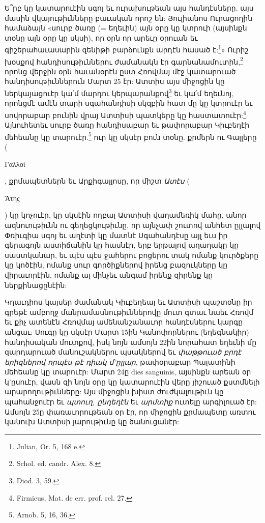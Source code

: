\documentclass{article}
\begin{document}
{Ե՞րբ կը կատարուէին սգոյ եւ ուրախութեան այս հանդէսները. այս մասին վկայութիւնները բաւական որոշ են: Յուլիանոս Ուրացողին համաձայն «սուրբ ծառը (= եղեւին) այն օրը կը կտրուի (այսինքն տօնը այն օրը կը սկսի), որ օրն որ արեւը օրուան եւ գիշերահաւասարին զենիթի բարձունքն արդէն հասած է:\footnote{Julian, Or. 5, 168 e.}» Ուրիշ խօսքով հանդիսութիւններու ժամանակն էր գարնանամուտին,\footnote{Schol. ed. candr. Alex. 8.} որոնց վերջին օրն հաւանօրէն ըստ Հռովմայ մէջ կատարուած հանդիսութիւններուն Մարտ 25 էր: Ատտիս այս միջոցին կը ներկայացուէր կա՛մ մարդու կերպարանքով\footnote{Diod. 3, 59.} եւ կա՛մ եղեւնոյ, որոնցմէ ամէն տարի սգահանդիսի սկզբին հատ մը կը կտրուէր եւ սովորաբար բունին վրայ Ատտիսի պատկերը կը հաստատուէր:\footnote{Firmicus, Mat. de err. prof. rel. 27.} Այնուհետեւ սուրբ ծառը հանդիսաբար եւ թափորաբար Կիւբեղէի մեհեանը կը տարուէր.\footnote{Arnob. 5, 16, 36.} ուր կը սկսէր բուն տօնը. քրմերն ու Գալլերը (\begin{greek}Γαλλοί\end{greek}, քրմապետներն եւ Արքիգալլոսը, որ միշտ \emph{Ատէս} (\begin{greek}Ἄτης\end{greek}) կը կոչուէր, կը սկսէին ողբալ Ատտիսի վաղամեռիկ մահը, անոր ազնուութիւնն ու գեղեցկութիւնը, որ այնչափ շուտով անհետ ըլլալով Փռիւգիա սգոյ եւ աղէտի կը մատնէ Սգահանդէսը այլ եւս իր գերագոյն աստիճանին կը հասնէր, երբ երթալով աղաղակը կը սաստկանար, եւ պէս պէս ջահերու բոցերու տակ ոմանք կուրծքերը կը կոծէին, ոմանք սուր գործիքներով իրենց բազուկները կը վիրաւորէին, ոմանք ալ մինչեւ անգամ իրենք զիրենք կը ներքինացընէին:

Կղաւդիոս կայսեր ժամանակ Կիւբեղեայ եւ Ատտիսի պաշտօնը իր գրեթէ ամբողջ մանրամասնութիւններովը մուտ գտաւ նաեւ Հռովմ եւ քիչ ատենէն Հռովմայ ամենանշանաւոր հանդէսներու կարգը անցաւ: Սուգը կը սկսէր Մարտ 15ին Կանոփորներու (եղեգնակիր) հանդիսական մուտքով, իսկ նոյն ամսոյն 22ին նորահատ եղեւնի մը զարդարուած մանուշակներու պսակներով եւ \emph{փաթթուած բրդէ երիզներով որպէս թէ դիակ մ'ըլլար}, թափօրաբար Պալատինի մեհեանը կը տարուէր: Մարտ 24ը dies sanguinis, այսինքն արեան օր կ'ըսուէր, վասն զի նոյն օրը կը կատարուէին վերը յիշուած քստմնելի արարողութիւնները: Այս միջոցին խիստ ժուժկալութիւն կը պահանջուէր եւ \emph{պտուղ, ընդեղէն} եւ \emph{արմտիք} ուտելը արգիլուած էր: Ամսոյն 25ը փառաւորութեան օր էր, որ միջոցին քրմապետը առտու կանուխ Ատտիսի յարութիւնը կը ծանուցանէր:

}
\end{document}
